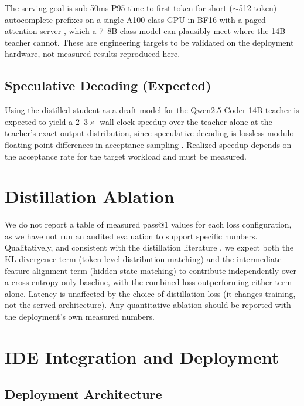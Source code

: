 \documentclass[11pt,a4paper]{article}
\begin{document}
The serving goal is sub-50ms P95 time-to-first-token for short ($\sim$512-token) autocomplete prefixes
on a single A100-class GPU in BF16 with a paged-attention server \cite{kwon2023efficient}, which a
7--8B-class model can plausibly meet where the 14B teacher cannot. These are engineering targets to be
validated on the deployment hardware, not measured results reproduced here.

\subsection{Speculative Decoding (Expected)}

Using the distilled student as a draft model for the Qwen2.5-Coder-14B teacher is expected to yield a
$2$--$3\times$ wall-clock speedup over the teacher alone at the teacher's exact output distribution,
since speculative decoding is lossless modulo floating-point differences in acceptance sampling
\cite{leviathan2023speculative,chen2023accelerating}. Realized speedup depends on the acceptance rate
for the target workload and must be measured.

\section{Distillation Ablation}

We do not report a table of measured pass@1 values for each loss configuration, as we have not run an
audited evaluation to support specific numbers. Qualitatively, and consistent with the distillation
literature \cite{hinton2015distilling,kim2016seq,gu2024minillm,jiao2020tinybert}, we expect both the
KL-divergence term (token-level distribution matching) and the intermediate-feature-alignment term
(hidden-state matching) to contribute independently over a cross-entropy-only baseline, with the
combined loss outperforming either term alone. Latency is unaffected by the choice of distillation loss
(it changes training, not the served architecture). Any quantitative ablation should be reported with
the deployment's own measured numbers.

\section{IDE Integration and Deployment}

\subsection{Deployment Architecture}
\end{document}
